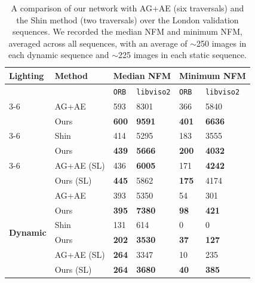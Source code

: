 \documentclass[letterpaper, 10pt, journal, twoside]{IEEEtran}
\begin{document}
\begin{table}[t]
	\centering
	\caption{A comparison of our network with AG+AE (six traversals) and the Shin method \cite{Shin2019} (two traversals) over the London validation sequences. We recorded the median NFM and minimum NFM, averaged across all sequences, with an average of $\sim$250 images in each dynamic sequence and $\sim$225 images in each static sequence.}
	\vspace{0mm}
	\label{tab1}
	\begin{threeparttable}
	\begin{tabular}{@{}llllll@{}}
			\toprule
			Lighting & Method & \multicolumn{2}{l}{Median NFM} & \multicolumn{2}{l}{Minimum NFM} \\ \midrule
			& 	                          & \texttt{ORB} & \texttt{libviso2} & \texttt{ORB} & \texttt{libviso2}\\ \cmidrule{3-6}
			\multirow{7}{*}{\textbf{Static}} 
			& AG+AE                       & 593          & 8301              & 366          & 5840 \\
			& Ours                        & \textbf{600} & \textbf{9591}     & \textbf{401} & \textbf{6636}\\ \cmidrule{3-6}
			& Shin \cite{Shin2019}        & 414          & 5295              & 183          & 3555\\
			& Ours                        & \textbf{439} & \textbf{5666}     & \textbf{200} & \textbf{4032} \\ \cmidrule{3-6}
			& AG+AE (SL)              & 436          & \textbf{6005}     & 171          & \textbf{4242}\\
			& Ours (SL)               & \textbf{445} & 5862              & \textbf{175} & 4174 \\ \midrule
			\multirow{7}{*}{\textbf{Dynamic}} 
			& AG+AE                       & 393          & 5350              & 54           & 301 \\
			& Ours                        & \textbf{395} & \textbf{7380}     & \textbf{98}  & \textbf{421}\\ \cmidrule{3-6}
			& Shin \cite{Shin2019}        & 131          & 614               & 0            & 0\\
			& Ours                        & \textbf{202} & \textbf{3530}     & \textbf{37} & \textbf{127} \\ \cmidrule{3-6} 
			& AG+AE (SL)              & \textbf{264} & 3347              & 10          & 235\\
			& Ours (SL)               & \textbf{264} & \textbf{3680}     & \textbf{40} & \textbf{385} \\ \bottomrule
		\end{tabular}
	\end{threeparttable}
\end{table}
	
\end{document}
